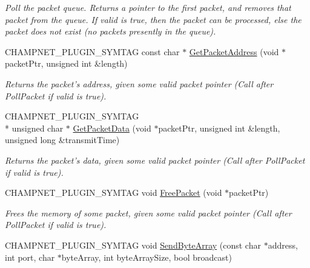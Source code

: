 \begin{DoxyCompactItemize}
\begin{DoxyCompactList}\small\item\em Poll the packet queue. Returns a pointer to the first packet, and removes that packet from the queue. If valid is true, then the packet can be processed, else the packet does not exist (no packets presently in the queue). \end{DoxyCompactList}\item 
\hypertarget{namespace_champ_net_plugin_aeada1879c38a3ec33c57b15ba63fa53d}{C\-H\-A\-M\-P\-N\-E\-T\-\_\-\-P\-L\-U\-G\-I\-N\-\_\-\-S\-Y\-M\-T\-A\-G const char $\ast$ \hyperlink{namespace_champ_net_plugin_aeada1879c38a3ec33c57b15ba63fa53d}{Get\-Packet\-Address} (void $\ast$packet\-Ptr, unsigned int \&length)}\label{namespace_champ_net_plugin_aeada1879c38a3ec33c57b15ba63fa53d}

\begin{DoxyCompactList}\small\item\em Returns the packet's address, given some valid packet pointer (Call after Poll\-Packet if valid is true). \end{DoxyCompactList}\item 
\hypertarget{namespace_champ_net_plugin_acd1de52a8a043992fd80521d459ba977}{C\-H\-A\-M\-P\-N\-E\-T\-\_\-\-P\-L\-U\-G\-I\-N\-\_\-\-S\-Y\-M\-T\-A\-G \\*
unsigned char $\ast$ \hyperlink{namespace_champ_net_plugin_acd1de52a8a043992fd80521d459ba977}{Get\-Packet\-Data} (void $\ast$packet\-Ptr, unsigned int \&length, unsigned long \&transmit\-Time)}\label{namespace_champ_net_plugin_acd1de52a8a043992fd80521d459ba977}

\begin{DoxyCompactList}\small\item\em Returns the packet's data, given some valid packet pointer (Call after Poll\-Packet if valid is true). \end{DoxyCompactList}\item 
\hypertarget{namespace_champ_net_plugin_a713f269ee3388251cca3c05b331bcb77}{C\-H\-A\-M\-P\-N\-E\-T\-\_\-\-P\-L\-U\-G\-I\-N\-\_\-\-S\-Y\-M\-T\-A\-G void \hyperlink{namespace_champ_net_plugin_a713f269ee3388251cca3c05b331bcb77}{Free\-Packet} (void $\ast$packet\-Ptr)}\label{namespace_champ_net_plugin_a713f269ee3388251cca3c05b331bcb77}

\begin{DoxyCompactList}\small\item\em Frees the memory of some packet, given some valid packet pointer (Call after Poll\-Packet if valid is true). \end{DoxyCompactList}\item 
\hypertarget{namespace_champ_net_plugin_ae315c9fac65ee4956d71ab7f2db8a13a}{C\-H\-A\-M\-P\-N\-E\-T\-\_\-\-P\-L\-U\-G\-I\-N\-\_\-\-S\-Y\-M\-T\-A\-G void \hyperlink{namespace_champ_net_plugin_ae315c9fac65ee4956d71ab7f2db8a13a}{Send\-Byte\-Array} (const char $\ast$address, int port, char $\ast$byte\-Array, int byte\-Array\-Size, bool broadcast)}\label{namespace_champ_net_plugin_ae315c9fac65ee4956d71ab7f2db8a13a}


\end{DoxyCompactItemize}
